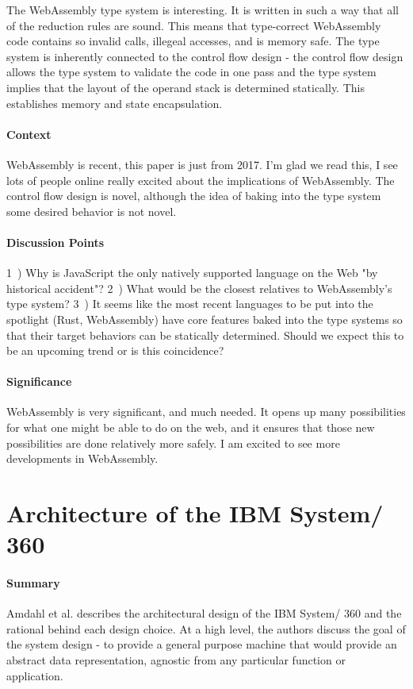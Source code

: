 The WebAssembly type system is interesting. It is written in such a way
that all of the reduction rules are sound. This means that type-correct
WebAssembly code contains so invalid calls, illegeal accesses, and is memory
safe. The type system is inherently connected to the control flow design -
the control flow design allows the type system to validate the code in one
pass and the type system implies that the layout of the operand stack is
determined statically. This establishes memory and state encapsulation.
\paragraph{\textbf{Context}}
WebAssembly is recent, this paper is just from 2017. I'm glad we read
this, I see lots of people online really excited about the implications of
WebAssembly. The control flow design is novel, although the idea of baking
into the type system some desired behavior is not novel.
\paragraph{\textbf{Discussion Points}}
1~) Why is JavaScript the only natively supported language on the Web "by
historical accident"?
2~) What would be the closest relatives to WebAssembly's type system?
3~) It seems like the most recent languages to be put into the spotlight
(Rust, WebAssembly) have core features baked into the type systems so that
their target behaviors can be statically determined. Should we expect this
to be an upcoming trend or is this coincidence?
\paragraph{\textbf{Significance}}
WebAssembly is very significant, and much needed. It opens up many
possibilities for what one might be able to do on the web, and it ensures
that those new possibilities are done relatively more safely. I am excited
to see more developments in WebAssembly.


\section {Architecture of the IBM System/ 360 \cite{amdahl1964architecture}}


\paragraph{\textbf{Summary}}
Amdahl et al. describes the architectural design of the IBM System/ 360 and
the rational behind each design choice. At a high level, the authors discuss
the goal of the system design - to provide a general purpose machine that
would provide an abstract data representation, agnostic from any particular
function or application.
